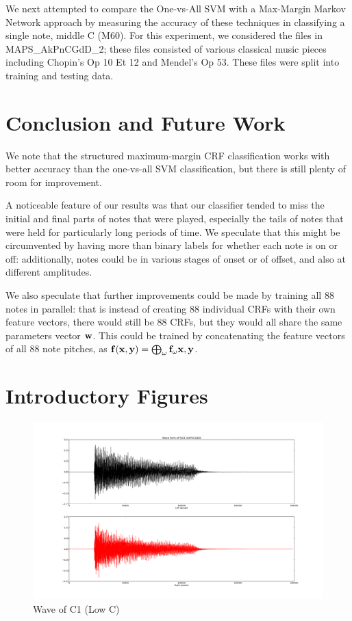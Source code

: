 \documentclass{article}
\begin{document}
We next attempted to compare the One-vs-All SVM with a Max-Margin Markov Network approach by measuring the accuracy of these techniques in classifying a single note, middle C (M60). For this experiment, we considered the files in MAPS_AkPnCGdD_2; these files consisted of various classical music pieces including Chopin's Op 10 Et 12 and Mendel's Op 53. These files were split into training and testing data. 


\section{Conclusion and Future Work}
We note that the structured maximum-margin CRF classification works with
better accuracy than the one-vs-all SVM classification, but there is still
plenty of room for improvement.

A noticeable feature of our results was that our classifier tended to miss the
initial and final parts of notes that were played, especially the tails of
notes that were held for particularly long periods of time.
We speculate that this might be circumvented by having more than binary labels
for whether each note is on or off: additionally, notes could be in various
stages of onset or of offset, and also at different amplitudes.

We also speculate that further improvements could be made by training all 88
notes in parallel: that is instead of creating 88 individual CRFs with their
own feature vectors, there would still be 88 CRFs, but they would all share
the same parameters vector $\mathbf{w}$. This could be trained by concatenating the
feature vectors of all 88 note pitches, as $\mathbf{f}(\mathbf{x},\mathbf{y}) =
\bigoplus_{\omega}\mathbf{f}_{\omega}{\mathbf{x},\mathbf{y}}$. 





\section{Introductory Figures}
\begin{figure}
\includegraphics[scale=.13]{wave_m23.png}
\caption{Wave of C1 (Low C)}
\label{fig:wave}
\end{figure}
\end{document}
